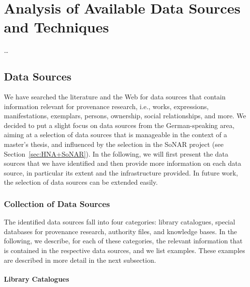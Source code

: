 \chapter{Analysis of Available Data Sources and Techniques}
\label{chap:analysis}

\dots


\section{Data Sources}
\label{sec:data_sources}

We have searched the literature and the Web for data sources that contain information
relevant for provenance research, i.e., works, expressions, manifestations, exemplars,
persons, ownership, social relationships, and more. 
We decided to put a slight focus on data sources from the German-speaking area, 
aiming at a selection of data sources that is manageable in the context of a master's thesis,
and influenced by the selection in the SoNAR project (see Section~\ref{sec:HNA+SoNAR}).
In the following, we will first present the data sources that we have identified
and then provide more information on each data source,
in particular its extent and the infrastructure provided.
In future work, the selection of data sources can be extended easily.

\subsection{Collection of Data Sources}

The identified data sources fall into four categories:
library catalogues, special databases for provenance research, authority files, and knowledge bases.
In the following, we describe, for each of these categories, the relevant information that is
contained in the respective data sources, and we list examples.
These examples are described in more detail in the next subsection.

\subsubsection{Library Catalogues}

